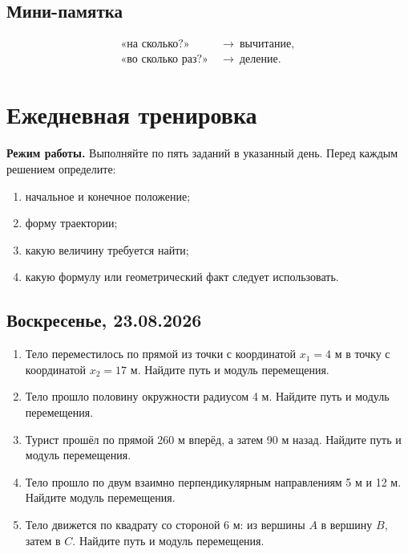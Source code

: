 \documentclass[a4paper,12pt]{article}
\begin{document}
\subsection*{Мини-памятка}

\[
\boxed{
\begin{aligned}
\text{«на сколько?»}
&\ \longrightarrow\ \text{вычитание},\\
\text{«во сколько раз?»}
&\ \longrightarrow\ \text{деление}.
\end{aligned}
}
\]


\newpage

\section*{Ежедневная тренировка}

\textbf{Режим работы.}
Выполняйте по пять заданий в указанный день.
Перед каждым решением определите:

\begin{enumerate}
    \item начальное и конечное положение;
    \item форму траектории;
    \item какую величину требуется найти;
    \item какую формулу или геометрический факт следует использовать.
\end{enumerate}


\subsection*{\textcolor{darkaccent}{Воскресенье, 23.08.2026}}

\begin{enumerate}[label=\arabic*.]

\item
Тело переместилось по прямой из точки
с координатой $x_1=4$ м
в точку с координатой $x_2=17$ м.
Найдите путь и модуль перемещения.

\item
Тело прошло половину окружности радиусом 4 м.
Найдите путь и модуль перемещения.

\item
Турист прошёл по прямой 260 м вперёд,
а затем 90 м назад.
Найдите путь и модуль перемещения.

\item
Тело прошло по двум взаимно перпендикулярным
направлениям 5 м и 12 м.
Найдите модуль перемещения.

\item
Тело движется по квадрату со стороной 6 м:
из вершины $A$ в вершину $B$, затем в $C$.
Найдите путь и модуль перемещения.

\end{enumerate}
\end{document}
